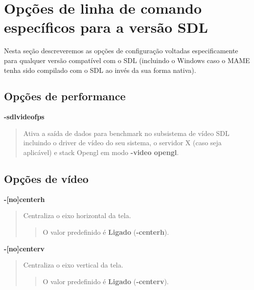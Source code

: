 \documentclass[letterpaper,10pt,brazil]{sphinxmanual}
\begin{document}
\section{Opções de linha de comando específicos para a versão SDL}
\label{commandline/sdlconfig:opcoes-de-linha-de-comando-especificos-para-a-versao-sdl}\label{commandline/sdlconfig::doc}
Nesta seção descreveremos as opções de configuração voltadas
especificamente para qualquer versão compatível com o SDL (incluindo o
Windows caso o MAME tenha sido compilado com o SDL ao invés da sua forma
nativa).


\subsection{Opções de performance}
\label{commandline/sdlconfig:opcoes-de-performance}\label{commandline/sdlconfig:mame-scommandline-sdlvideofps}
\textbf{-sdlvideofps}
\begin{quote}

Ativa a saída de dados para benchmark no subsistema de vídeo SDL
incluindo o driver de vídeo do seu sistema, o servidor X (caso seja
aplicável) e stack Opengl em modo \textbf{-video opengl}.
\end{quote}


\subsection{Opções de vídeo}
\label{commandline/sdlconfig:opcoes-de-video}\label{commandline/sdlconfig:mame-scommandline-centerh}
\textbf{-{[}no{]}centerh}
\begin{quote}

Centraliza o eixo horizontal da tela.
\begin{quote}

O valor predefinido é \textbf{Ligado} (\textbf{-centerh}).
\end{quote}
\end{quote}
\label{commandline/sdlconfig:mame-scommandline-centerv}
\textbf{-{[}no{]}centerv}
\begin{quote}

Centraliza o eixo vertical da tela.
\begin{quote}

O valor predefinido é \textbf{Ligado} (\textbf{-centerv}).
\end{quote}
\end{quote}
\end{document}
